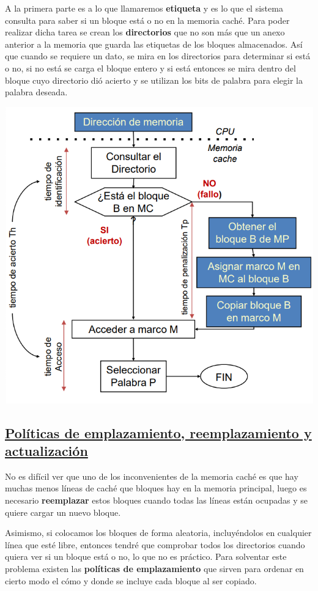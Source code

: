 \documentclass[a4paper,10pt]{book}
\begin{document}
A la primera parte es a lo que llamaremos \textbf{etiqueta} y es lo que el sistema consulta para saber si un bloque está o no en la memoria caché. Para poder realizar dicha tarea se crean los \textbf{directorios} que no son más que un anexo anterior a la memoria que guarda las etiquetas de los bloques almacenados. Así que cuando se requiere un dato, se mira en los directorios para determinar si está o no, si no está se carga el bloque entero y si está entonces se mira dentro del bloque cuyo directorio dió acierto y se utilizan los bits de palabra para elegir la palabra deseada.
\begin{center}
\includegraphics[scale=0.55]{funcionamiento de memoria cache}
\end{center}

\subsection*{\underline{Políticas de emplazamiento, reemplazamiento y actualización}}
No es difícil ver que uno de los inconvenientes de la memoria caché es que hay muchas menos líneas de caché que bloques hay en la memoria principal, luego es necesario \textbf{reemplazar} estos bloques cuando todas las líneas están ocupadas y se quiere cargar un nuevo bloque.

Asimismo, si colocamos los bloques de forma aleatoria, incluyéndolos en cualquier línea que esté libre, entonces tendré que comprobar todos los directorios cuando quiera ver si un bloque está o no, lo que no es práctico. Para solventar este problema existen las \textbf{políticas de emplazamiento} que sirven para ordenar en cierto modo el cómo y donde se incluye cada bloque al ser copiado.
\end{document}
